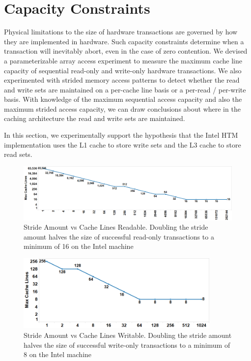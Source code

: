 \section{Capacity Constraints}
\label{sec:capacity}
Physical limitations to the size of hardware 
transactions are
governed by how they are implemented in hardware. 
Such capacity constraints
determine when a transaction will inevitably abort, 
even in the case of zero contention. We 
devised a parameterizable array access
experiment to measure the maximum cache line capacity 
of sequential read-only and write-only
hardware transactions. We also experimented with strided 
memory access patterns
to detect whether the read and write sets are maintained
on a per-cache line basis or a per-read / per-write basis.
With knowledge of the maximum sequential access 
capacity and also the maximum
strided access capacity, we can draw conclusions 
about where in the caching
architecture the read and write sets are 
maintained. 


In this section, we experimentally support the hypothesis
that the Intel HTM implementation uses the L1 cache to 
store write sets and the L3 cache to store read sets.

\begin{figure}[H]%
\centering
\includegraphics[width=\linewidth]{images/wttm_stride_read_intel}
\caption{Stride Amount vs Cache Lines Readable. Doubling the stride amount halves the size of successful read-only
transactions to a minimum of 16 on the Intel machine}
\label{fig:wttm_stride_read_intel}
\end{figure}


\begin{figure}[H]%
\centering
\includegraphics[width=10cm]{images/wttm_stride_write_intel}
\caption{Stride Amount vs Cache Lines Writable. 
Doubling the stride amount halves the size of successful write-only
transactions to a minimum of 8 on the Intel machine}
\label{fig:wttm_stride_write_intel}
\end{figure}



